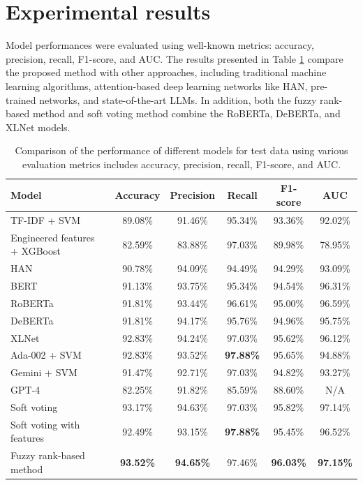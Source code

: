 \section{Experimental results}
Model performances were evaluated using well-known metrics: accuracy, precision, recall, F1-score, and AUC. The results presented in Table \ref{tab:results} compare the proposed method with other approaches, including traditional machine learning algorithms, attention-based deep learning networks like HAN, pre-trained networks, and state-of-the-art LLMs. In addition, both the fuzzy rank-based method and soft voting method combine the RoBERTa, DeBERTa, and XLNet models.
\begin{table}[]
    \caption{ Comparison of the performance of different models for test data using various evaluation metrics includes accuracy, precision, recall, F1-score, and AUC.}
    \label{tab:results}
    \centering
\begin{tabular}{lccccc}
\hline
Model                   & Accuracy & Precision & Recall  & F1-score & AUC     \\ \hline
TF-IDF + SVM            & 89.08\%  & 91.46\%   & 95.34\% & 93.36\%  & 92.02\% \\
Engineered features + XGBoost        & 82.59\%  & 83.88\%   & 97.03\% & 89.98\%  & 78.95\% \\
HAN                     & 90.78\%  & 94.09\%   & 94.49\% & 94.29\%  & 93.09\% \\
BERT                    & 91.13\%  & 93.75\%   & 95.34\% & 94.54\%  & 96.31\% \\
RoBERTa                 & 91.81\%  & 93.44\%   & 96.61\% & 95.00\%  & 96.59\% \\
DeBERTa                 & 91.81\%  & 94.17\%   & 95.76\% & 94.96\%  & 95.75\% \\
XLNet                   & 92.83\%  & 94.24\%   & 97.03\% & 95.62\%  & 96.12\% \\
Ada-002 + SVM     & 92.83\%  & 93.52\%   & \textbf{97.88\%} & 95.65\%  & 94.88\% \\
Gemini + SVM  & 91.47\%  & 92.71\%   & 97.03\% & 94.82\%  & 93.27\% \\
GPT-4                   & 82.25\%  & 91.82\%   & 85.59\% & 88.60\%  & N/A     \\
Soft voting             & 93.17\%  & 94.63\%   & 97.03\% & 95.82\%  & 97.14\% \\
Soft voting with features       & 92.49\%  & 93.15\%   & \textbf{97.88\%} & 95.45\%  & 96.52\% \\
Fuzzy rank-based method & \textbf{93.52\%}  & \textbf{94.65\%}   & 97.46\% & \textbf{96.03\%}  & \textbf{97.15\%}     \\ \hline
\end{tabular}
\end{table}
